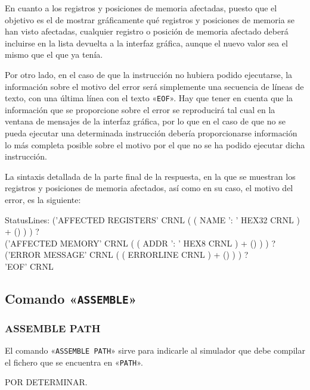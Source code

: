 \documentclass[notitlepage,11pt,a4paper,final,twoside]{article}
\begin{document}
En cuanto a los registros y posiciones de memoria afectadas, puesto
que el objetivo es el de mostrar gráficamente qué registros y
posiciones de memoria se han visto afectadas, cualquier registro o
posición de memoria afectado deberá incluirse en la lista devuelta a
la interfaz gráfica, aunque el nuevo valor sea el mismo que el que ya
tenía.

Por otro lado, en el caso de que la instrucción no hubiera podido
ejecutarse, la información sobre el motivo del error será simplemente
una secuencia de líneas de texto, con una última línea con el texto
«\texttt{EOF}». Hay que tener en cuenta que la información que se
proporcione sobre el error se reproducirá tal cual en la ventana de
mensajes de la interfaz gráfica, por lo que en el caso de que no se
pueda ejecutar una determinada instrucción debería proporcionarse
información lo más completa posible sobre el motivo por el que no se
ha podido ejecutar dicha instrucción.

La sintaxis detallada de la parte final de la respuesta, en la que se
muestran los registros y posiciones de memoria afectados, así como en
su caso, el motivo del error, es la siguiente:
\begin{rail}
StatusLines:
('AFFECTED REGISTERS' CRNL ( ( NAME ': ' HEX32 CRNL ) + () ) ) ? \\
('AFFECTED MEMORY' CRNL ( ( ADDR ': ' HEX8 CRNL ) + () ) ) ? \\
('ERROR MESSAGE' CRNL ( ( ERRORLINE CRNL ) + () ) ) ? \\
'EOF' CRNL
\end{rail}



\subsection{Comando «\texttt{ASSEMBLE}»}

\subsubsection{ASSEMBLE PATH}

El comando «\texttt{ASSEMBLE PATH}» sirve para indicarle al simulador
que debe compilar el fichero que se encuentra en «\texttt{PATH}».

POR DETERMINAR.
\end{document}

